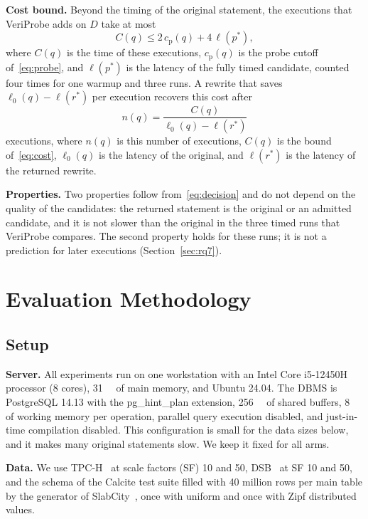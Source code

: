 \documentclass[conference]{IEEEtran}
\newcommand{\sys}{VeriProbe}
\begin{document}
\textbf{Cost bound.}
Beyond the timing of the original statement, the executions that \sys{} adds on $D$ take at most
\begin{equation}
C(q) \le 2\,c_{\mathrm{p}}(q) + 4\,\ell(p^{\ast}),
\label{eq:cost}
\end{equation}
where $C(q)$ is the time of these executions, $c_{\mathrm{p}}(q)$ is the probe cutoff of~\eqref{eq:probe}, and $\ell(p^{\ast})$ is the latency of the fully timed candidate, counted four times for one warmup and three runs.
A rewrite that saves $\ell_{0}(q) - \ell(r^{\ast})$ per execution recovers this cost after
\begin{equation}
n(q) = \frac{C(q)}{\ell_{0}(q) - \ell(r^{\ast})}
\label{eq:amortize}
\end{equation}
executions, where $n(q)$ is this number of executions, $C(q)$ is the bound of~\eqref{eq:cost}, $\ell_{0}(q)$ is the latency of the original, and $\ell(r^{\ast})$ is the latency of the returned rewrite.

\textbf{Properties.}
Two properties follow from~\eqref{eq:decision} and do not depend on the quality of the candidates: the returned statement is the original or an admitted candidate, and it is not slower than the original in the three timed runs that \sys{} compares.
The second property holds for these runs; it is not a prediction for later executions (Section~\ref{sec:rq7}).

\section{Evaluation Methodology}
\label{sec:method}

\subsection{Setup}
\label{sec:setup}

\textbf{Server.}
All experiments run on one workstation with an Intel Core i5-12450H processor (8 cores), \SI{31}{\gibi\byte} of main memory, and Ubuntu 24.04.
The DBMS is PostgreSQL 14.13 with the pg\_hint\_plan extension, \SI{256}{\mebi\byte} of shared buffers, \SI{8}{\mebi\byte} of working memory per operation, parallel query execution disabled, and just-in-time compilation disabled.
This configuration is small for the data sizes below, and it makes many original statements slow.
We keep it fixed for all arms.

\textbf{Data.}
We use TPC-H~\cite{tpch} at scale factors (SF) 10 and 50, DSB~\cite{ding2021} at SF 10 and 50, and the schema of the Calcite test suite filled with 40 million rows per main table by the generator of SlabCity~\cite{dong2023}, once with uniform and once with Zipf distributed values.
\end{document}
